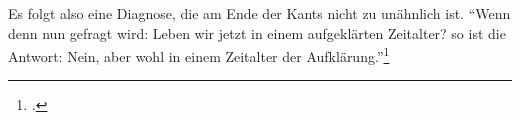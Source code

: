 \documentclass[a4paper, 12pt]{article}
\begin{document}
\begin{onehalfspace}
\noindent Es folgt also eine Diagnose, die am Ende der Kants nicht zu unähnlich ist. "`Wenn denn nun gefragt wird: Leben wir jetzt in einem aufgeklärten Zeitalter? so ist die Antwort: Nein, aber wohl in einem Zeitalter der Aufklärung."'\footnote{\Cite[Siehe][S. 491]{kant}.}

\newpage

\end{onehalfspace}
\nocite{*}
\printbibliography
\end{document}
